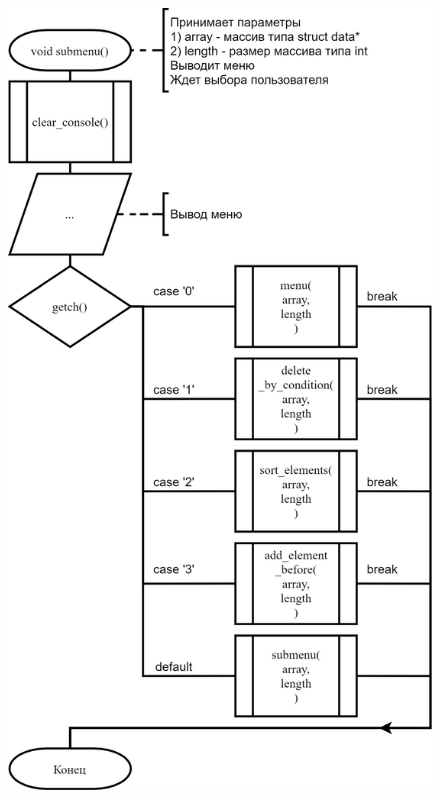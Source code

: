 \begin{figure}[!htp]
    \includegraphics{../../Makefile-project/src/submenu/submenu.png}
\end{figure}

